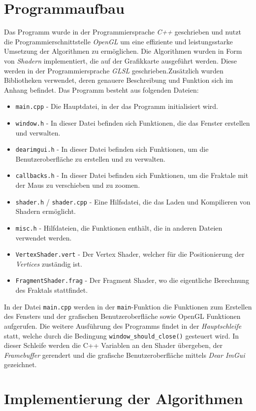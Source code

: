 \section{Programmaufbau}
Das Programm wurde in der Programmiersprache \textit{C++} geschrieben und nutzt
die Programmierschnittstelle \textit{OpenGL} um eine effiziente und
leistungsstarke Umsetzung der Algorithmen zu ermöglichen. Die Algorithmen
wurden in Form von \textit{Shadern} implementiert, die auf der Grafikkarte
ausgeführt werden. Diese werden in der Programmiersprache \textit{GLSL}
geschrieben.\hfill \break \newline \noindent Zusätzlich wurden Bibliotheken
verwendet, deren genauere Beschreibung und Funktion sich im Anhang befindet.
\hfill \break \newline \noindent Das Programm besteht aus folgenden Dateien:
\begin{itemize}
    \item \texttt{main.cpp} - Die Hauptdatei, in der das Programm initialisiert wird.
    \item \texttt{window.h} - In dieser Datei befinden sich Funktionen, die das Fenster erstellen und verwalten.
    \item \texttt{dearimgui.h} - In dieser Datei befinden sich Funktionen, um die Benutzeroberfläche zu erstellen und zu verwalten.
    \item \texttt{callbacks.h} - In dieser Datei befinden sich Funktionen, um die Fraktale mit der Maus zu verschieben und zu zoomen.
    \item \texttt{shader.h} / \texttt{shader.cpp} - Eine Hilfsdatei, die das Laden und Kompilieren von Shadern ermöglicht.
    \item \texttt{misc.h} - Hilfdateien, die Funktionen enthält, die in anderen Dateien verwendet werden.
    \item \texttt{VertexShader.vert} - Der Vertex Shader, welcher für die Positionierung der \textit{Vertices} zuständig ist.
    \item \texttt{FragmentShader.frag} - Der Fragment Shader, wo die eigentliche Berechnung des Fraktals stattfindet.
\end{itemize}
\noindent
In der Datei \texttt{main.cpp} werden in der \texttt{main}-Funktion die
Funktionen zum Erstellen des Fensters und der grafischen Benutzeroberfläche
sowie OpenGL Funktionen aufgerufen. Die weitere Ausführung des Programms findet
in der \textit{Hauptschleife} statt, welche durch die Bedingung
\texttt{window\_should\_close()} gesteuert wird. In dieser Schleife werden die
C++ Variablen an den Shader übergeben, der \textit{Framebuffer} gerendert und
die grafische Benutzeroberfläche mittels \textit{Dear ImGui} gezeichnet.

\section{Implementierung der Algorithmen}

